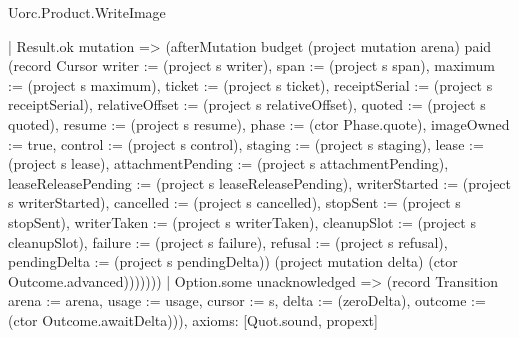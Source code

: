 \begin{lexlean}{Uorc.Product.WriteImage}
\begin{semanticmodule}
{            | Result.ok mutation => (afterMutation budget (project mutation arena) paid (record Cursor {writer := (project s writer), span := (project s span), maximum := (project s maximum), ticket := (project s ticket), receiptSerial := (project s receiptSerial), relativeOffset := (project s relativeOffset), quoted := (project s quoted), resume := (project s resume), phase := (ctor Phase.quote), imageOwned := true, control := (project s control), staging := (project s staging), lease := (project s lease), attachmentPending := (project s attachmentPending), leaseReleasePending := (project s leaseReleasePending), writerStarted := (project s writerStarted), cancelled := (project s cancelled), stopSent := (project s stopSent), writerTaken := (project s writerTaken), cleanupSlot := (project s cleanupSlot), failure := (project s failure), refusal := (project s refusal), pendingDelta := (project s pendingDelta)}) (project mutation delta) (ctor Outcome.advanced)))))))
    | Option.some unacknowledged => (record Transition {arena := arena, usage := usage, cursor := s, delta := (zeroDelta), outcome := (ctor Outcome.awaitDelta)})),
  axioms: [Quot.sound, propext]
}


\end{semanticmodule}
\end{lexlean}
